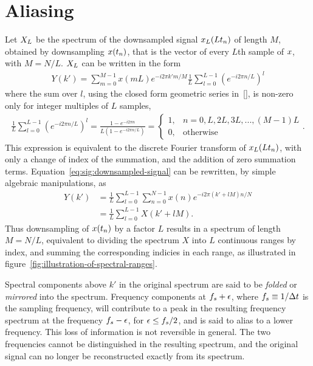 \section{Aliasing}
Let $X_{L}$ be the spectrum of the downsampled signal $x_{L}(L t_n)$ of length $M$, obtained by downsampling $x(t_n)$, that is the vector of every $L$th sample of $x$, with $ M = N/L$. $X_{L}$ can be written in the form
\begin{align}
Y(k') = \sum_{m=0}^{M-1} x(mL) e^{- i 2 \pi k' m / M} \frac{1}{L} \sum_{l=0}^{L-1} \left(  e^{-i 2 \pi n / L} \right)^l \label{eq:sig:downsampled-signal}
\end{align}
where the sum over $l$, using the closed form geometric series in~\eqref{}, is non-zero only for integer multiples of $L$ samples,
\begin{align*}
\frac{1}{L} \sum_{l=0}^{L-1} \left(  e^{-i 2 \pi n / L} \right)^l =  \frac{ 1 - e^{- i 2 \pi n }}{ L (1 - e ^{-i 2 \pi n/ L})} =
  \begin{cases}
   1, & n = 0,L,2L,3L,...,(M-1)L  \\
   0, & \textrm{otherwise}
  \end{cases}
        .
\end{align*}
This expression is equivalent to the discrete Fourier transform of $x_{L}(L t_n)$, with only a change of index of the summation, and the addition of zero summation terms. Equation~\eqref{eq:sig:downsampled-signal} can be rewritten, by simple algebraic manipulations, as
\begin{align*}
Y(k')
  &= \frac{1}{L} \sum_{l=0}^{L-1} \sum_{n=0}^{N-1} x(n) e^{-i 2 \pi (k' + lM) n / N} \\
  &= \frac{1}{L} \sum_{l=0}^{L-1} X(k' + lM) .
\end{align*}
Thus downsampling of $x(t_n)$ by a factor $L$ results in a spectrum of length $M = N / L$, equivalent to dividing the spectrum $X$ into $L$ continuous ranges by index, and summing the corresponding indicies in each range, as illustrated in figure~\ref{fig:illustration-of-spectral-ranges}.

Spectral components above $k'$ in the original spectrum are said to be \textit{folded} or \textit{mirrored} into the spectrum. Frequency components at $f_s + \epsilon$, where $f_s \equiv 1/\Delta t$ is the sampling frequency, will contribute to a peak in the resulting frequency spectrum at the frequency $f_s - \epsilon$, for $\epsilon \le f_s / 2$, and is said to alias to a lower frequency. This loss of information is not reversible in general. The two frequencies cannot be distinguished in the resulting spectrum, and the original signal can no longer be reconstructed exactly from its spectrum.

